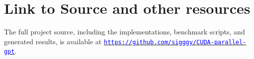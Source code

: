 \section{Link to Source and other resources}

The full project source, including the implementations, benchmark scripts, and generated results, is available at \href{https://github.com/sigggy/CUDA-parallel-gpt}{\textcolor{blue}{\nolinkurl{https://github.com/sigggy/CUDA-parallel-gpt}}}.
